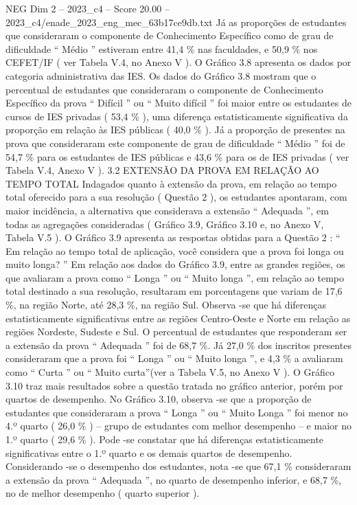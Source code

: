 \begin{textsample}{NEG Dim 2 – 2023\_c4 – Score 20.00 – 2023\_c4/enade\_2023\_eng\_mec\_63b17ce9db.txt}
Já as proporções de estudantes que consideraram o componente de Conhecimento Específico como de grau de dificuldade “ Médio ” estiveram entre 41,4 \% nas faculdades, e 50,9 \% nos CEFET/IF ( ver Tabela V.4, no Anexo V ).
O Gráfico 3.8 apresenta os dados por categoria administrativa das IES.
Os dados do Gráfico 3.8 mostram que o percentual de estudantes que consideraram o componente de Conhecimento Específico da prova “ Difícil ” ou “ Muito difícil ” foi maior entre os estudantes de cursos de IES privadas ( 53,4 \% ), uma diferença estatisticamente significativa da proporção em relação às IES públicas ( 40,0 \% ).
Já a proporção de presentes na prova que consideraram este componente de grau de dificuldade “ Médio ” foi de 54,7 \% para os estudantes de IES públicas e 43,6 \% para os de IES privadas ( ver Tabela V.4, Anexo V ). 3.2 EXTENSÃO DA PROVA EM RELAÇÃO AO TEMPO TOTAL Indagados quanto à extensão da prova, em relação ao tempo total oferecido para a sua resolução ( Questão 2 ), os estudantes apontaram, com maior incidência, a alternativa que considerava a extensão “ Adequada ”, em todas as agregações consideradas ( Gráfico 3.9, Gráfico 3.10 e, no Anexo V, Tabela V.5 ).
O Gráfico 3.9 apresenta as respostas obtidas para a Questão 2 : “ Em relação ao tempo total de aplicação, você considera que a prova foi longa ou muito longa? ” Em relação aos dados do Gráfico 3.9, entre as grandes regiões, os que avaliaram a prova como “ Longa ” ou “ Muito longa ”, em relação ao tempo total destinado a sua resolução, resultaram em porcentagens que variam de 17,6 \%, na região Norte, até 28,3 \%, na região Sul.
Observa -se que há diferenças estatisticamente significativas entre as regiões Centro-Oeste e Norte em relação as regiões Nordeste, Sudeste e Sul.
O percentual de estudantes que responderam ser a extensão da prova “ Adequada ” foi de 68,7 \%.
Já 27,0 \% dos inscritos presentes consideraram que a prova foi “ Longa ” ou “ Muito longa ”, e 4,3 \% a avaliaram como “ Curta ” ou “ Muito curta”(ver a Tabela V.5, no Anexo V ).
O Gráfico 3.10 traz mais resultados sobre a questão tratada no gráfico anterior, porém por quartos de desempenho.
No Gráfico 3.10, observa -se que a proporção de estudantes que consideraram a prova “ Longa ” ou “ Muito Longa ” foi menor no 4.º quarto ( 26,0 \% ) – grupo de estudantes com melhor desempenho – e maior no 1.º quarto ( 29,6 \% ).
Pode -se constatar que há diferenças estatisticamente significativas entre o 1.º quarto e os demais quartos de desempenho.
Considerando -se o desempenho dos estudantes, nota -se que 67,1 \% consideraram a extensão da prova “ Adequada ”, no quarto de desempenho inferior, e 68,7 \%, no de melhor desempenho ( quarto superior ).

\end{textsample}
